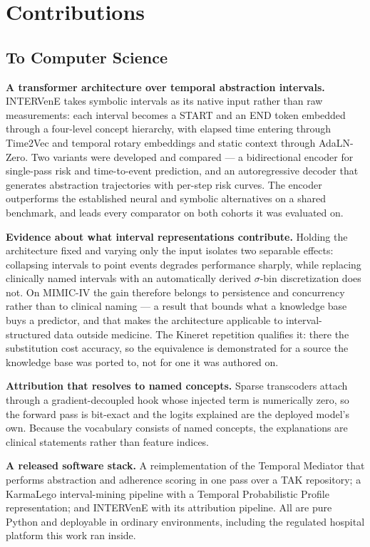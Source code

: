 \section{Contributions}
\label{sec:contributions}

\subsection{To Computer Science}

\textbf{A transformer architecture over temporal abstraction intervals.}
INTERVenE takes symbolic intervals as its native input rather than raw
measurements: each interval becomes a START and an END token embedded through a
four-level concept hierarchy, with elapsed time entering through Time2Vec and
temporal rotary embeddings and static context through AdaLN-Zero. Two variants
were developed and compared --- a bidirectional encoder for single-pass risk and
time-to-event prediction, and an autoregressive decoder that generates
abstraction trajectories with per-step risk curves. The encoder outperforms the
established neural and symbolic alternatives on a shared benchmark, and leads
every comparator on both cohorts it was evaluated on.

\textbf{Evidence about what interval representations contribute.} Holding the
architecture fixed and varying only the input isolates two separable effects:
collapsing intervals to point events degrades performance sharply, while
replacing clinically named intervals with an automatically derived $\sigma$-bin
discretization does not. On MIMIC-IV the gain therefore belongs to persistence
and concurrency rather than to clinical naming --- a result that bounds what a
knowledge base buys a predictor, and that makes the architecture applicable to
interval-structured data outside medicine. The Kineret repetition qualifies it:
there the substitution cost accuracy, so the equivalence is demonstrated for a
source the knowledge base was ported to, not for one it was authored on.

\textbf{Attribution that resolves to named concepts.} Sparse transcoders attach
through a gradient-decoupled hook whose injected term is numerically zero, so
the forward pass is bit-exact and the logits explained are the deployed model's
own. Because the vocabulary consists of named concepts, the explanations are
clinical statements rather than feature indices.

\textbf{A released software stack.} A reimplementation of the Temporal Mediator
that performs abstraction and adherence scoring in one pass over a TAK
repository; a KarmaLego interval-mining pipeline with a Temporal Probabilistic
Profile representation; and INTERVenE with its attribution pipeline. All are
pure Python and deployable in ordinary environments, including the regulated
hospital platform this work ran inside.

